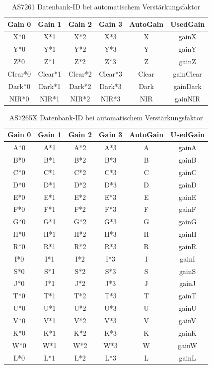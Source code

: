\begin{table}[H]
\centering
\begin{tabular}{ c c c c c c}
Gain 0 & Gain 1 & Gain 2 & Gain 3 &  AutoGain & UsedGain \\
\hline
X*0 & X*1 & X*2 & X*3 & X & gainX  \\ 
Y*0 & Y*1 & Y*2 & Y*3 &  Y & gainY  \\
Z*0 & Z*1 & Z*2 & Z*3 &  Z & gainZ  \\
Clear*0 & Clear*1 & Clear*2 & Clear*3 & Clear & gainClear \\ 
Dark*0 & Dark*1 & Dark*2 & Dark*3 &  Dark & gainDark \\ 
NIR*0 & NIR*1 & NIR*2 & NIR*3 &  NIR & gainNIR  \\ 
\end{tabular}
\caption{AS7261 Datenbank-ID bei automatischem Verstärkungsfaktor}
\label{auto_Datenbankname}
\end{table}
\begin{table}[H]
\centering
\begin{tabular}{ c c c c c c}
Gain 0 & Gain 1 & Gain 2 & Gain 3 &  AutoGain & UsedGain \\
\hline
A*0 & A*1 & A*2 & A*3 & A & gainA  \\
B*0 & B*1 & B*2 & B*3 & B & gainB  \\
C*0 & C*1 & C*2 & C*3 & C & gainC  \\
D*0 & D*1 & D*2 & D*3 & D & gainD  \\
E*0 & E*1 & E*2 & E*3 & E & gainE  \\
F*0 & F*1 & F*2 & F*3 & F & gainF  \\
G*0 & G*1 & G*2 & G*3 & G & gainG  \\
H*0 & H*1 & H*2 & H*3 & H & gainH  \\
R*0 & R*1 & R*2 & R*3 & R & gainR  \\
I*0 & I*1 & I*2 & I*3 & I & gainI  \\
S*0 & S*1 & S*2 & S*3 & S & gainS  \\
J*0 & J*1 & J*2 & J*3 & J & gainJ  \\
T*0 & T*1 & T*2 & T*3 & T & gainT  \\
U*0 & U*1 & U*2 & U*3 & U & gainU  \\
V*0 & V*1 & V*2 & V*3 & V & gainV  \\
K*0 & K*1 & K*2 & K*3 & K & gainK  \\
W*0 & W*1 & W*2 & W*3 & W & gainW  \\
L*0 & L*1 & L*2 & L*3 & L & gainL  \\

\end{tabular}
\caption{AS7265X Datenbank-ID bei automatischem Verstärkungsfaktor}
\label{auto_Datenbankname_AS7265X}
\end{table}

